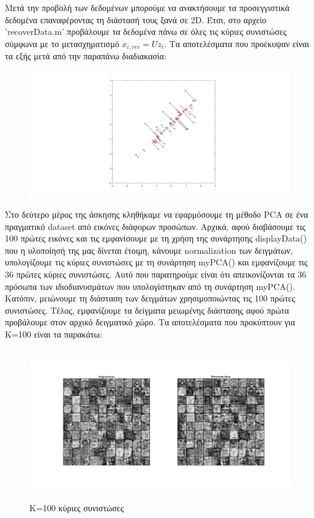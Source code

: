 \documentclass{article}
\begin{document}
	\noindent
	Μετά την προβολή των δεδομένων μπορούμε να ανακτήσουμε τα προσεγγιστικά δεδομένα επαναφέροντας τη διάστασή τους ξανά σε 2D. Έτσι, στο αρχείο 'recoverData.m' προβάλουμε τα δεδομένα πάνω σε όλες τις κύριες συνιστώσες σύμφωνα με το μετασχηματισμό  $x_{i,rec} = Uz_{i}$. Tα αποτελέσματα που προέκυψαν είναι τα εξής μετά από την παραπάνω διαδιακασία:
	
	\begin{figure}[h!]
		\centering
		\includegraphics[width=\linewidth]{../exercise1_1/images/reconstructed_dataset.png}
	\end{figure}

	\noindent
	Στο δεύτερο μέρος της άσκησης κληθήκαμε να εφαρμόσουμε τη μέθοδο PCA σε ένα πραγματικό dataset από εικόνες διάφορων προσώπων. Αρχικά, αφού διαβάσουμε τις 100 πρώτες εικόνες και τις εμφανίσουμε με τη χρήση της συνάρτησης displayData() που η υλοποίησή της μας δίνεται έτοιμη, κάνουμε normalization των δειγμάτων, υπολογίζουμε τις κύριες συνιστώσες με τη συνάρτηση myPCA() και εμφανίζουμε τις 36 πρώτες κύριες συνιστώσες. Αυτό που παρατηρούμε είναι ότι απεικονίζονται τα 36 πρόσωπα των ιδιοδιανυσμάτων που υπολογίστηκαν από τη συνάρτηση myPCA().\\
	
	\noindent
	Κατόπιν, μειώνουμε τη διάσταση των δειγμάτων χρησιμοποιώντας τις 100 πρώτες συνιστώσες. Τέλος, εμφανίζουμε τα δείγματα μειωμένης διάστασης αφού πρώτα προβάλουμε στον αρχικό δειγματικό χώρο. Τα αποτελέσματα που προκύπτουν για Κ=100 είναι τα παρακάτω:
	
	 \begin{figure}[h!]
	 	\centering
	 	\includegraphics[height=6.5cm ,width=\linewidth]{../exercise1_1/images/faces_K_100.png}
	 	\caption{K=100 κύριες συνιστώσες}
	 \end{figure}
 
\end{document}

